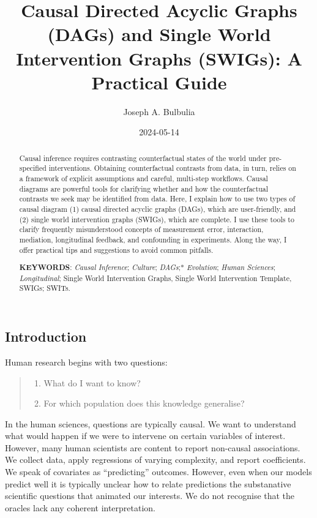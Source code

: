 \documentclass[
  single column]{article}
\title{Causal Directed Acyclic Graphs (DAGs) and Single World
Intervention Graphs (SWIGs): A Practical Guide}
\author{Joseph A. Bulbulia}
\affil{%
             \small{     Victoria University of Wellington, New Zealand
          ORCID \textcolor[HTML]{A6CE39}{\aiOrcid} ~0000-0002-5861-2056 }
              }
\date{2024-05-14}
\providecommand{\tightlist}{%
  \setlength{\itemsep}{0pt}\setlength{\parskip}{0pt}}\usepackage{longtable,booktabs,array}
\begin{document}
\maketitle
\begin{abstract}
Causal inference requires contrasting counterfactual states of the world
under pre-specified interventions. Obtaining counterfactual contrasts
from data, in turn, relies on a framework of explicit assumptions and
careful, multi-step workflows. Causal diagrams are powerful tools for
clarifying whether and how the counterfactual contrasts we seek may be
identified from data. Here, I explain how to use two types of causal
diagram (1) causal directed acyclic graphs (DAGs), which are
user-friendly, and (2) single world intervention graphs (SWIGs), which
are complete. I use these tools to clarify frequently misunderstood
concepts of measurement error, interaction, mediation, longitudinal
feedback, and confounding in experiments. Along the way, I offer
practical tips and suggestions to avoid common pitfalls.

\textbf{KEYWORDS}: \emph{Causal Inference}; \emph{Culture};
\emph{DAGs};* \emph{Evolution}; \emph{Human Sciences};
\emph{Longitudinal}; Single World Intervention Graphs, Single World
Intervention Template, SWIGs; SWITs.
\end{abstract}

\subsection{Introduction}\label{introduction}

Human research begins with two questions:

\begin{quote}
\begin{enumerate}
\def\labelenumi{\arabic{enumi}.}
\tightlist
\item
  What do I want to know?
\item
  For which population does this knowledge generalise?
\end{enumerate}
\end{quote}

In the human sciences, questions are typically causal. We want to
understand what would happen if we were to intervene on certain
variables of interest. However, many human scientists are content to
report non-causal associations. We collect data, apply regressions of
varying complexity, and report coefficients. We speak of covariates as
``predicting'' outcomes. However, even when our models predict well it
is typically unclear how to relate predictions the substanative
scientific questions that animated our interests. We do not recognise
that the oracles lack any coherent interpretation.
\end{document}
